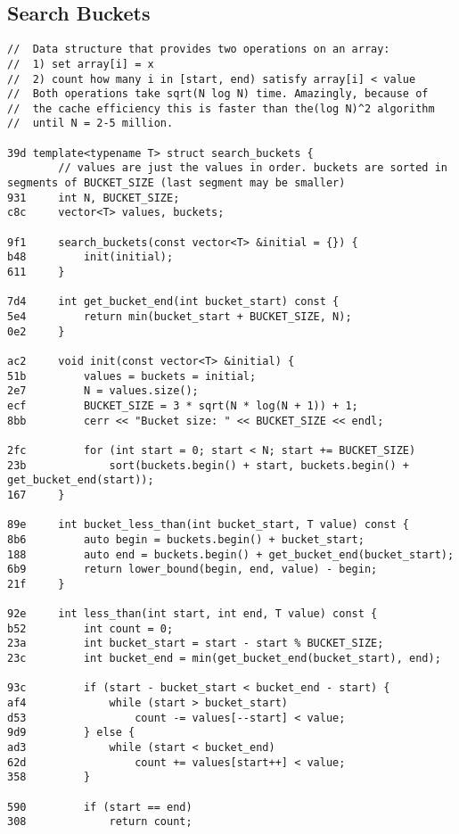 \documentclass[11pt, a4paper, twoside]{article}
\begin{document}
\subsection{ Search Buckets}
\begin{lstlisting}
//  Data structure that provides two operations on an array:
//  1) set array[i] = x
//  2) count how many i in [start, end) satisfy array[i] < value
//  Both operations take sqrt(N log N) time. Amazingly, because of 
//  the cache efficiency this is faster than the(log N)^2 algorithm 
//  until N = 2-5 million.

39d template<typename T> struct search_buckets {
        // values are just the values in order. buckets are sorted in segments of BUCKET_SIZE (last segment may be smaller)
931     int N, BUCKET_SIZE;
c8c     vector<T> values, buckets;
    
9f1     search_buckets(const vector<T> &initial = {}) {
b48         init(initial);
611     }
    
7d4     int get_bucket_end(int bucket_start) const {
5e4         return min(bucket_start + BUCKET_SIZE, N);
0e2     }
    
ac2     void init(const vector<T> &initial) {
51b         values = buckets = initial;
2e7         N = values.size();
ecf         BUCKET_SIZE = 3 * sqrt(N * log(N + 1)) + 1;
8bb         cerr << "Bucket size: " << BUCKET_SIZE << endl;
    
2fc         for (int start = 0; start < N; start += BUCKET_SIZE)
23b             sort(buckets.begin() + start, buckets.begin() + get_bucket_end(start));
167     }
    
89e     int bucket_less_than(int bucket_start, T value) const {
8b6         auto begin = buckets.begin() + bucket_start;
188         auto end = buckets.begin() + get_bucket_end(bucket_start);
6b9         return lower_bound(begin, end, value) - begin;
21f     }
    
92e     int less_than(int start, int end, T value) const {
b52         int count = 0;
23a         int bucket_start = start - start % BUCKET_SIZE;
23c         int bucket_end = min(get_bucket_end(bucket_start), end);
    
93c         if (start - bucket_start < bucket_end - start) {
af4             while (start > bucket_start)
d53                 count -= values[--start] < value;
9d9         } else {
ad3             while (start < bucket_end)
62d                 count += values[start++] < value;
358         }
    
590         if (start == end)
308             return count;
    

\end{lstlisting}
\end{document}
